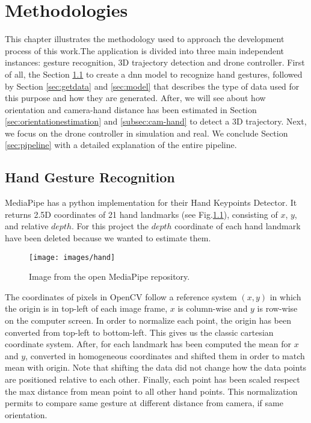\chapter{Methodologies}
\label{chap:methods}

This chapter illustrates the methodology used to approach the development process of this work.The application is divided into three main independent instances: gesture recognition, 3D trajectory detection and drone controller. First of all, the Section \ref{sec:handgestrec} to create a \gls{dnn} model to recognize hand gestures, followed by Section \ref{sec:getdata} and \ref{sec:model} that describes the type of data used for this purpose and how they are generated. After, we will see about how orientation and camera-hand distance has been estimated in Section \ref{sec:orientationestimation} and \ref{subsec:cam-hand} to detect a 3D trajectory. Next, we focus on the drone controller in simulation and real. We conclude Section \ref{sec:pipeline} with a detailed explanation of the entire pipeline.


\section{Hand Gesture Recognition}
\label{sec:handgestrec}
MediaPipe has a python implementation for their Hand Keypoints Detector. It returns 2.5D coordinates of 21 hand landmarks (see Fig.\ref{fig:handland}), consisting of $x$, $y$, and relative $depth$. For this project the $depth$ coordinate of each hand landmark have been deleted because we wanted to estimate them.


\begin{figure}[H]
	\centering
	\texttt{[image: images/hand]}
	\caption[Hand Landmarks.]{Image from the open MediaPipe repository.}
	\label{fig:handland}
\end{figure}

\noindent The coordinates of pixels in OpenCV follow a reference system $(x,y)$ in which the origin is in top-left of each image frame, $x$ is column-wise and $y$ is row-wise on the computer screen. In order to normalize each point, the origin has been converted from top-left to bottom-left. This gives us the classic cartesian coordinate system. After, for each landmark has been computed the mean for $x$ and $y$, converted in homogeneous coordinates and shifted them in order to match mean with origin. Note that shifting the data did not change how the data points are positioned relative to each other. Finally, each point has been scaled respect the max distance from mean point to all other hand points. This normalization permits to compare same gesture at different distance from camera, if same orientation. 

